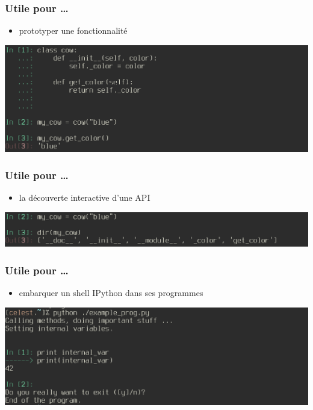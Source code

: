 \begin{frame}
  \frametitle{Utile pour \ldots}
    \begin{itemize}
      \item prototyper une fonctionnalité
    \end{itemize}
  \includegraphics[scale=0.35]{prototype.png}
\end{frame}

\begin{frame}
  \frametitle{Utile pour \ldots}
    \begin{itemize}
      \item la découverte interactive d'une API
    \end{itemize}
  \includegraphics[scale=0.35]{api_discover.png}
\end{frame}

\begin{frame}
  \frametitle{Utile pour \ldots}
    \begin{itemize}
      \item embarquer un shell IPython dans ses programmes
    \end{itemize}
  \includegraphics[scale=0.35]{embedded_ipython.png}
\end{frame}
